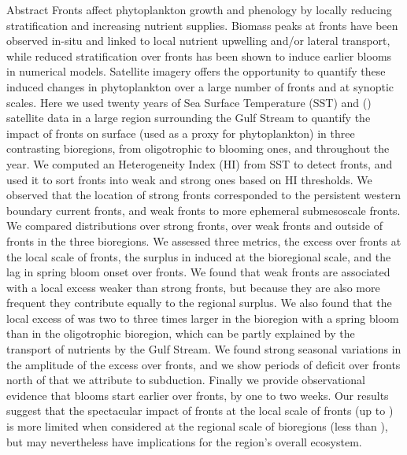 \begin{articleBlock}{Abstract}
  Fronts affect phytoplankton growth and phenology by locally reducing stratification and increasing nutrient supplies.
  Biomass peaks at fronts have been observed in-situ and linked to local nutrient upwelling and/or lateral transport, while reduced stratification over fronts has been shown to induce earlier blooms in numerical models.
  Satellite imagery offers the opportunity to quantify these induced changes in phytoplankton over a large number of fronts and at synoptic scales.
  Here we used twenty years of Sea Surface Temperature (SST) and  () satellite data in a large region surrounding the Gulf Stream to quantify the impact of fronts on surface  (used as a proxy for phytoplankton) in three contrasting bioregions, from oligotrophic to blooming ones, and throughout the year.
  We computed an Heterogeneity Index (HI) from SST to detect fronts, and used it to sort fronts into weak and strong ones based on HI thresholds.
  We observed that the location of strong fronts corresponded to the persistent western boundary current fronts, and weak fronts to more ephemeral submesoscale fronts.
  We compared  distributions over strong fronts, over weak fronts and outside of fronts in the three bioregions.
  We assessed three metrics, the  excess over fronts at the local scale of fronts, the surplus in  induced at the bioregional scale, and the lag in spring bloom onset over fronts.
  We found that weak fronts are associated with a local  excess weaker than strong fronts, but because they are also more frequent they contribute equally to the regional  surplus.
  We also found that the local excess of  was two to three times larger in the bioregion with a spring bloom than in the oligotrophic bioregion, which can be partly explained by the transport of nutrients by the Gulf Stream.
  We found strong seasonal variations in the amplitude of the  excess over fronts, and we show periods of  deficit over fronts north of  that we attribute to subduction.
  Finally we provide observational evidence that blooms start earlier over fronts, by one to two weeks.
  Our results suggest that the spectacular impact of fronts at the local scale of fronts (up to ) is more limited when considered at the regional scale of bioregions (less than ), but may nevertheless have implications for the region's overall ecosystem.
\end{articleBlock}


